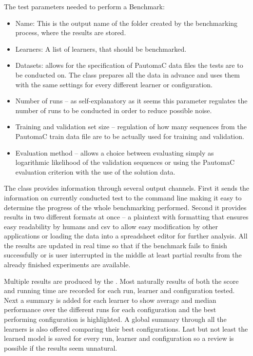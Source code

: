 The test parameters needed to perform a Benchmark:

\begin{itemize}
	\item[] Name: This is the output name of the folder created by the benchmarking process, where the results are stored.
	\item[] Learners: A list of learners, that should be benchmarked.
	\item[] Datasets: allows for the specification of PautomaC data files the tests are to be conducted on. The  class prepares all the data in advance and uses them with the same settings for every different learner or configuration.
	\item[] Number of runs -- as self-explanatory as it seems this parameter regulates the number of runs to be conducted in order to reduce possible noise.
	\item[] Training and validation set size -- regulation of how many sequences from the PautomaC train data file are to be actually used for training and validation.
	\item[] Evaluation method -- allows a choice between evaluating simply as logarithmic likelihood of the validation sequences or using the PautomaC evaluation criterion with the use of the solution data.
\end{itemize}

The  class provides information through several output channels. First it sends the information on currently conducted test to the command line making it easy to determine the progress of the whole benchmarking performed. Second it provides results in two different formats at once -- a plaintext with formatting that ensures easy readability by humans and \gls{csv} to allow easy modification by other applications or loading the data into a spreadsheet editor for further analysis. All the results are updated in real time so that if the benchmark fails to finish successfully or is user interrupted in the middle at least partial results from the already finished experiments are available.

Multiple results are produced by the . Most naturally results of both the score and running time are recorded for each run, learner and configuration tested. Next a summary is added for each learner to show average and median performance over the different runs for each configuration and the best performing configuration is highlighted. A global summary through all the learners is also offered comparing their best configurations. Last but not least the learned model is saved for every run, learner and configuration so a review is possible if the results seem unnatural.

